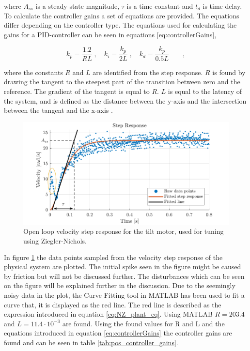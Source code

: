 \documentclass[../../main.tex]{subfiles}
\begin{document}
where $A_{ss}$ is a steady-state magnitude, $\tau$ is a time constant and $t_{d}$ is time delay. To calculate the controller gains a set of equations are provided. The equations differ depending on the controller type. The equations used for calculating the gains for a PID-controller can be seen in equations \ref{eq:controllerGains},

\begin{equation}
k_p = \frac{1.2}{RL}\;, \quad k_i = \frac{k_p}{2L}\;, \quad k_d = \frac{k_p}{0.5L} \qquad ,
\label{eq:controllerGains}
\end{equation}

where the constants $R$ and $L$ are identified from the step response. $R$ is found by drawing the tangent to the steepest part of the transition between zero and the reference. The gradient of the tangent is equal to $R$. $L$ is equal to the latency of the system, and is defined as the distance between the y-axis and the intersection between the tangent and the x-axis \cite{}. 



\begin{figure}
    \centering
    \includegraphics[width = 1\textwidth]{Sections/System_Design/Images/Ziegler-Nichols_Stepresponse_anno.png}
    \caption{Open loop velocity step response for the tilt motor, used for tuning using Ziegler-Nichols.}
    \label{fig:stepPlantNZ}
\end{figure}

In figure \ref{fig:stepPlantNZ} the data points sampled from the velocity step response of the physical system are plotted. The initial spike seen in the figure might be caused by friction but will not be discussed further. The disturbances which can be seen on the figure will be explained further in the discussion. Due to the seemingly noisy data in the plot, the Curve Fitting tool in MATLAB has been used to fit a curve that, it is displayed as the red line. The red line is described as the expression introduced in equation \ref{eq:NZ_plant_eq}. Using MATLAB $R = 203.4 $ and $L = 11.4 \cdot 10^{-3}$ are found. Using the found values for R and L and the equations introduced in equation \ref{eq:controllerGains} the controller gains are found and can be seen in table \ref{tab:pos_controller_gains}.
\end{document}
